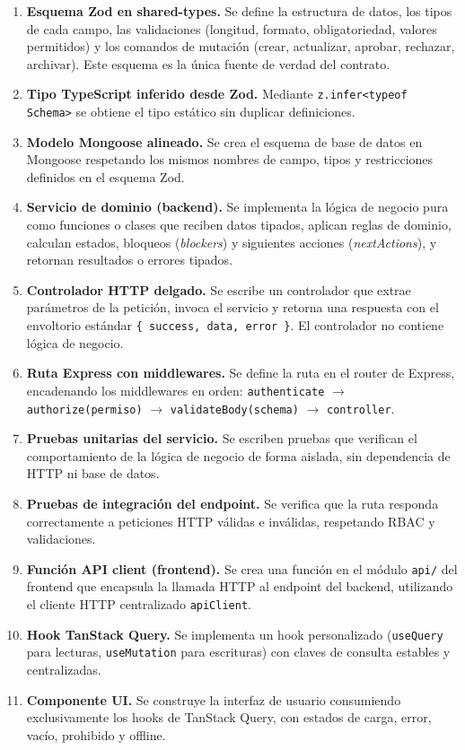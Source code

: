 \begin{enumerate}
    \item \textbf{Esquema Zod en shared-types.} Se define la estructura de datos, los tipos de cada campo, las validaciones (longitud, formato, obligatoriedad, valores permitidos) y los comandos de mutación (crear, actualizar, aprobar, rechazar, archivar). Este esquema es la única fuente de verdad del contrato.
    \item \textbf{Tipo TypeScript inferido desde Zod.} Mediante \texttt{z.infer<typeof Schema>} se obtiene el tipo estático sin duplicar definiciones.
    \item \textbf{Modelo Mongoose alineado.} Se crea el esquema de base de datos en Mongoose respetando los mismos nombres de campo, tipos y restricciones definidos en el esquema Zod.
    \item \textbf{Servicio de dominio (backend).} Se implementa la lógica de negocio pura como funciones o clases que reciben datos tipados, aplican reglas de dominio, calculan estados, bloqueos (\textit{blockers}) y siguientes acciones (\textit{nextActions}), y retornan resultados o errores tipados.
    \item \textbf{Controlador HTTP delgado.} Se escribe un controlador que extrae parámetros de la petición, invoca el servicio y retorna una respuesta con el envoltorio estándar \texttt{\{ success, data, error \}}. El controlador no contiene lógica de negocio.
    \item \textbf{Ruta Express con middlewares.} Se define la ruta en el router de Express, encadenando los middlewares en orden: \texttt{authenticate} $\rightarrow$ \texttt{authorize(permiso)} $\rightarrow$ \texttt{validateBody(schema)} $\rightarrow$ \texttt{controller}.
    \item \textbf{Pruebas unitarias del servicio.} Se escriben pruebas que verifican el comportamiento de la lógica de negocio de forma aislada, sin dependencia de HTTP ni base de datos.
    \item \textbf{Pruebas de integración del endpoint.} Se verifica que la ruta responda correctamente a peticiones HTTP válidas e inválidas, respetando RBAC y validaciones.
    \item \textbf{Función API client (frontend).} Se crea una función en el módulo \texttt{api/} del frontend que encapsula la llamada HTTP al endpoint del backend, utilizando el cliente HTTP centralizado \texttt{apiClient}.
    \item \textbf{Hook TanStack Query.} Se implementa un hook personalizado (\texttt{useQuery} para lecturas, \texttt{useMutation} para escrituras) con claves de consulta estables y centralizadas.
    \item \textbf{Componente UI.} Se construye la interfaz de usuario consumiendo exclusivamente los hooks de TanStack Query, con estados de carga, error, vacío, prohibido y offline.
\end{enumerate}

